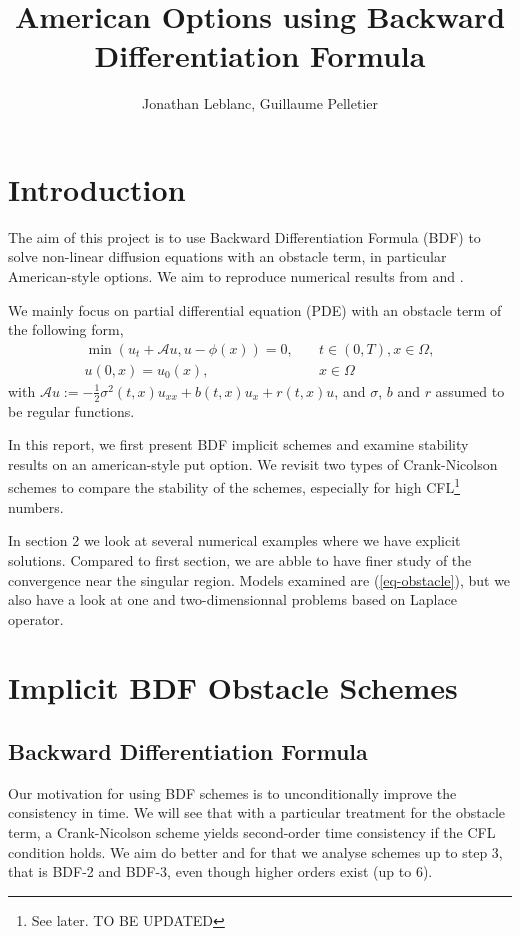 \documentclass[12pt,a4paper]{article}
\author{Jonathan Leblanc, Guillaume Pelletier}
\title{American Options using Backward Differentiation Formula}
\begin{document}
\maketitle
\newpage

\section{Introduction}

The aim of this project is to use Backward Differentiation Formula (BDF) to solve non-linear diffusion equations with an obstacle term, in particular American-style options. We aim to reproduce numerical results from \cite{Boka} and \cite{Oosterlee}.

We mainly focus on partial differential equation (PDE) with an obstacle term of the following form,
\begin{align}
	\min \left( u_t + \mathcal{A} u, u - \phi(x) \right) = 0,& \quad t \in (0,T), x \in \Omega, \label{eq-obstacle}\\
	u(0, x) = u_0(x),& \quad x \in \Omega \label{eq-obstacle_initcond}
\end{align}
with $\mathcal{A}u := -\frac{1}{2} \sigma^2(t,x) u_{xx} + b(t,x) u_x + r(t,x) u$, and $\sigma$, $b$ and $r$ assumed to be regular functions.

In this report, we first present BDF implicit schemes and examine stability results on an american-style put option. We revisit two types of Crank-Nicolson schemes to compare the stability of the schemes, especially for high CFL\footnote{See later. TO BE UPDATED} numbers.

In section 2 we look at several numerical examples where we have explicit solutions. Compared to first section, we are abble to have finer study of the convergence near the singular region. Models examined are (\ref{eq-obstacle}), but we also have a look at one and two-dimensionnal problems based on Laplace operator.

\section{Implicit BDF Obstacle Schemes}

	\subsection{Backward Differentiation Formula}

Our motivation for using BDF schemes is to unconditionally improve the consistency in time. We will see that with a particular treatment for the obstacle term, a Crank-Nicolson scheme yields second-order time consistency if the CFL condition holds. We aim do better and for that we analyse schemes up to step 3, that is BDF-2 and BDF-3, even though higher orders exist (up to 6).
\end{document}
